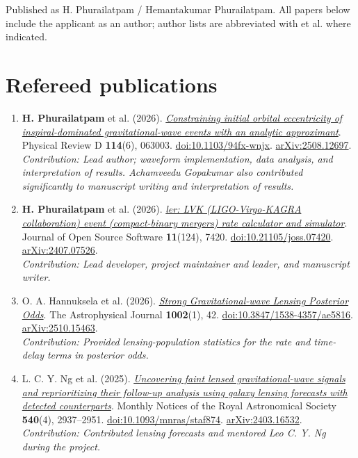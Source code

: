 \documentclass[11pt]{article}
\begin{document}
Published as H. Phurailatpam / Hemantakumar Phurailatpam. All papers below include the applicant as an author; author lists are abbreviated with et al. where indicated.
\section*{Refereed publications}
\begin{enumerate}
\item \textbf{H. Phurailatpam} et al. (2026). \href{https://doi.org/10.1103/94fx-wnjx}{\textit{Constraining initial orbital eccentricity of inspiral-dominated gravitational-wave events with an analytic approximant}}. Physical Review D \textbf{114}(6), 063003. \href{https://doi.org/10.1103/94fx-wnjx}{doi:10.1103/94fx-wnjx}. \href{https://arxiv.org/abs/2508.12697}{arXiv:2508.12697}.\\\emph{Contribution: Lead author; waveform implementation, data analysis, and interpretation of results. Achamveedu Gopakumar also contributed significantly to manuscript writing and interpretation of results.}

\item \textbf{H. Phurailatpam} et al. (2026). \href{https://doi.org/10.21105/joss.07420}{\textit{ler: LVK (LIGO-Virgo-KAGRA collaboration) event (compact-binary mergers) rate calculator and simulator}}. Journal of Open Source Software \textbf{11}(124), 7420. \href{https://doi.org/10.21105/joss.07420}{doi:10.21105/joss.07420}. \href{https://arxiv.org/abs/2407.07526}{arXiv:2407.07526}.\\\emph{Contribution: Lead developer, project maintainer and leader, and manuscript writer.}

\item O. A. Hannuksela et al. (2026). \href{https://doi.org/10.3847/1538-4357/ae5816}{\textit{Strong Gravitational-wave Lensing Posterior Odds}}. The Astrophysical Journal \textbf{1002}(1), 42. \href{https://doi.org/10.3847/1538-4357/ae5816}{doi:10.3847/1538-4357/ae5816}. \href{https://arxiv.org/abs/2510.15463}{arXiv:2510.15463}.\\\emph{Contribution: Provided lensing-population statistics for the rate and time-delay terms in posterior odds.}

\item L. C. Y. Ng et al. (2025). \href{https://doi.org/10.1093/mnras/staf874}{\textit{Uncovering faint lensed gravitational-wave signals and reprioritizing their follow-up analysis using galaxy lensing forecasts with detected counterparts}}. Monthly Notices of the Royal Astronomical Society \textbf{540}(4), 2937--2951. \href{https://doi.org/10.1093/mnras/staf874}{doi:10.1093/mnras/staf874}. \href{https://arxiv.org/abs/2403.16532}{arXiv:2403.16532}.\\\emph{Contribution: Contributed lensing forecasts and mentored Leo C. Y. Ng during the project.}


\end{enumerate}
\end{document}
